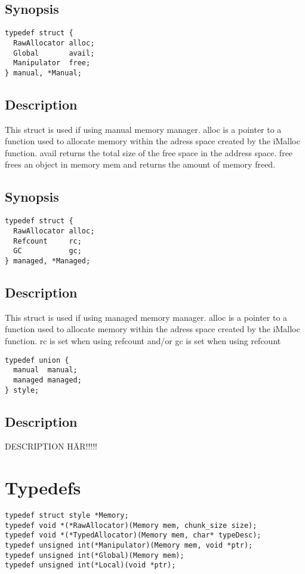 \documentclass{article}
\begin{document}
\subsection{Synopsis}
\begin{verbatim}
typedef struct {
  RawAllocator alloc;
  Global       avail;
  Manipulator  free;
} manual, *Manual; 
\end{verbatim}
\subsection*{Description}
This struct is used if using manual memory manager.
alloc is a pointer to a function used to allocate memory within the adress space created by the iMalloc function.
avail returns the total size of the free space in the address space.
free frees an object in memory mem and returns the amount of memory freed.


\subsection{Synopsis}
\begin{verbatim}
typedef struct {
  RawAllocator alloc;
  Refcount     rc;
  GC           gc;
} managed, *Managed;
\end{verbatim}
\subsection*{Description}
This struct is used if using managed memory manager.
alloc is a pointer to a function used to allocate memory within the adress space created by the iMalloc function.
rc is set when using refcount and/or gc is set when using refcount

\begin{verbatim}
typedef union {
  manual  manual;
  managed managed;
} style;
\end{verbatim}
\subsection*{Description}
DESCRIPTION HÄR!!!!!


\section{Typedefs} 
\begin{verbatim}
typedef struct style *Memory;
typedef void *(*RawAllocator)(Memory mem, chunk_size size);
typedef void *(*TypedAllocator)(Memory mem, char* typeDesc);
typedef unsigned int(*Manipulator)(Memory mem, void *ptr);
typedef unsigned int(*Global)(Memory mem);
typedef unsigned int(*Local)(void *ptr);
\end{verbatim}
\end{document}
